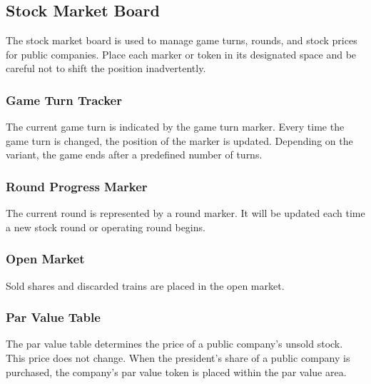 \documentclass{article}
\begin{document}
\begin{CJK}{UTF8}{min}
\subsection{Stock Market Board}
The stock market board is used to manage game turns, rounds, and stock
prices for public companies. Place each marker or token in its
designated space and be careful not to shift the position
inadvertently.



\subsubsection{Game Turn Tracker}
The current game turn is indicated by the game turn marker. Every time
the game turn is changed, the position of the marker is
updated. Depending on the variant, the game ends after a predefined
number of turns.



\subsubsection{Round Progress Marker}
The current round is represented by a round marker. It will be
updated each time a new stock round or operating round begins.



\subsubsection{Open Market}
Sold shares and discarded trains are placed in the open market.


\subsubsection{Par Value Table}
The par value table determines the price of a public company's
unsold stock. This price does not change. When the president's share
of a public company is purchased, the company's par value token is
placed within the par value area.


\end{CJK}
\end{document}
